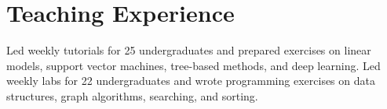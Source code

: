 \section{Teaching Experience}
Led weekly tutorials for 25 undergraduates and prepared exercises on linear models, support vector machines, tree-based methods, and deep learning.
\entryspace
{}
Led weekly labs for 22 undergraduates and wrote programming exercises on data structures, graph algorithms, searching, and sorting.
